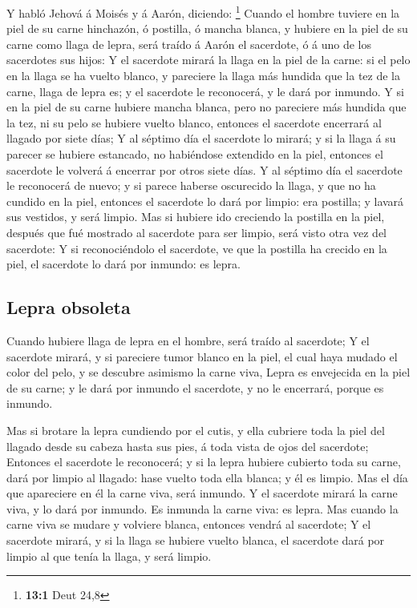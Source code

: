  Y habló Jehová á Moisés y á Aarón, diciendo: \footnote{\textbf{13:1}
  Deut 24,8}  Cuando el hombre tuviere en la piel de su
carne hinchazón, ó postilla, ó mancha blanca, y hubiere en la piel de su
carne como llaga de lepra, será traído á Aarón el sacerdote, ó á uno de
los sacerdotes sus hijos:  Y el sacerdote mirará la llaga
en la piel de la carne: si el pelo en la llaga se ha vuelto blanco, y
pareciere la llaga más hundida que la tez de la carne, llaga de lepra
es; y el sacerdote le reconocerá, y le dará por inmundo. 
Y si en la piel de su carne hubiere mancha blanca, pero no pareciere más
hundida que la tez, ni su pelo se hubiere vuelto blanco, entonces el
sacerdote encerrará al llagado por siete días;  Y al
séptimo día el sacerdote lo mirará; y si la llaga á su parecer se
hubiere estancado, no habiéndose extendido en la piel, entonces el
sacerdote le volverá á encerrar por otros siete días.  Y
al séptimo día el sacerdote le reconocerá de nuevo; y si parece haberse
oscurecido la llaga, y que no ha cundido en la piel, entonces el
sacerdote lo dará por limpio: era postilla; y lavará sus vestidos, y
será limpio.  Mas si hubiere ido creciendo la postilla en
la piel, después que fué mostrado al sacerdote para ser limpio, será
visto otra vez del sacerdote:  Y si reconociéndolo el
sacerdote, ve que la postilla ha crecido en la piel, el sacerdote lo
dará por inmundo: es lepra.

\hypertarget{lepra-obsoleta}{%
\subsection{Lepra obsoleta}\label{lepra-obsoleta}}

 Cuando hubiere llaga de lepra en el hombre, será traído
al sacerdote;  Y el sacerdote mirará, y si pareciere
tumor blanco en la piel, el cual haya mudado el color del pelo, y se
descubre asimismo la carne viva,  Lepra es envejecida en
la piel de su carne; y le dará por inmundo el sacerdote, y no le
encerrará, porque es inmundo.

 Mas si brotare la lepra cundiendo por el cutis, y ella
cubriere toda la piel del llagado desde su cabeza hasta sus pies, á toda
vista de ojos del sacerdote;  Entonces el sacerdote le
reconocerá; y si la lepra hubiere cubierto toda su carne, dará por
limpio al llagado: hase vuelto toda ella blanca; y él es limpio.
 Mas el día que apareciere en él la carne viva, será
inmundo.  Y el sacerdote mirará la carne viva, y lo dará
por inmundo. Es inmunda la carne viva: es lepra.  Mas
cuando la carne viva se mudare y volviere blanca, entonces vendrá al
sacerdote;  Y el sacerdote mirará, y si la llaga se
hubiere vuelto blanca, el sacerdote dará por limpio al que tenía la
llaga, y será limpio.

